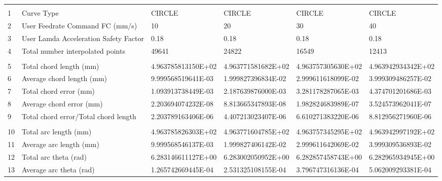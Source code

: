 

\begin{tabular}{ p{0.5cm} p{8.0cm} p{4.00cm} p{4.0cm} p{4.00cm} p{4.0cm}}
\hline
	&                                                      &                    &                      &                    & \\
1	& Curve Type	                                       & CIRCLE	            & CIRCLE	           & CIRCLE             &	CIRCLE \\
2	& User Feedrate Command FC (mm/s)                      &	10	            &    20                &	30	            &    40 \\
3	& User Lamda Acceleration Safety Factor	               &   0.18             &	0.18               &   0.18             &   0.18 \\
4	& Total number interpolated points	                   &   49641	        & 24822	               & 16549	            & 12413 \\
	&                                                      &                    &                      &                    & \\
5	& Total chord length (mm)	                           & 4.963785813150E+02	& 4.963771581682E+02   & 4.963757305630E+02	& 4.963942934342E+02 \\
6	& Average chord length (mm)	                           & 9.999568519641E-03	& 1.999827396834E-02   & 2.999611618099E-02	& 3.999309486257E-02 \\
7	& Total chord error (mm)	                           & 1.093913738449E-03	& 2.187639876000E-03   & 3.281178287065E-03	& 4.374701201686E-03 \\
8	& Average chord error (mm)	                           & 2.203694074232E-08	& 8.813665347893E-08   & 1.982824683989E-07	& 3.524573962041E-07 \\
9	& Total chord error/Total chord length                 & 2.203789163406E-06	& 4.407213023407E-06   & 6.610271383220E-06	& 8.812956271960E-06 \\
	&                                                      &                    &                    &                    & \\
10	& Total arc length (mm)	                               & 4.963785826303E+02	& 4.963771604785E+02   & 4.963757345295E+02	& 4.963942997192E+02 \\
11	& Average arc length (mm)	                           & 9.999568546137E-03	& 1.999827406142E-02   & 2.999611642069E-02	& 3.999309536893E-02 \\
12	& Total arc theta (rad)	                               & 6.283146611127E+00	& 6.283002050952E+00   & 6.282857458743E+00	& 6.282965934945E+00 \\
13	& Average arc theta (rad)	                           & 1.265742669445E-04	& 2.531325108155E-04   & 3.796747316136E-04	& 5.062009293381E-04 \\


\end{tabular}
